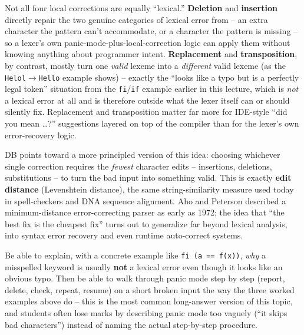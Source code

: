 \documentclass[full-course-notes.tex]{subfiles}
\begin{document}
\begin{examfocus}
Not all four local corrections are equally ``lexical.'' \textbf{Deletion} and \textbf{insertion}
directly repair the two genuine categories of lexical error from
 -- an extra character the pattern can't accommodate, or a
character the pattern is missing -- so a lexer's own panic-mode-plus-local-correction logic can
apply them without knowing anything about programmer intent. \textbf{Replacement} and
\textbf{transposition}, by contrast, mostly turn one \emph{valid} lexeme into a
\emph{different} valid lexeme (as the \texttt{Helol}$\to$\texttt{Hello} example shows) --
exactly the ``looks like a typo but is a perfectly legal token'' situation from the
\texttt{fi}/\texttt{if} example earlier in this lecture, which is \emph{not} a lexical error at
all and is therefore outside what the lexer itself can or should silently fix. Replacement and
transposition matter far more for IDE-style ``did you mean \dots?'' suggestions layered on top
of the compiler than for the lexer's own error-recovery logic.
\end{examfocus}

\begin{historynote}
DB points toward a more principled version of this idea: choosing whichever single correction
requires the \emph{fewest} character edits -- insertions, deletions, substitutions -- to turn
the bad input into something valid. This is exactly \textbf{edit distance} (Levenshtein
distance), the same string-similarity measure used today in spell-checkers and DNA sequence
alignment. Aho and Peterson described a minimum-distance error-correcting parser as early as
1972; the idea that ``the best fix is the cheapest fix'' turns out to generalize far beyond
lexical analysis, into syntax error recovery and even runtime auto-correct systems.
\end{historynote}

\begin{examfocus}
Be able to explain, with a concrete example like \texttt{fi (a == f(x))}, \emph{why} a
misspelled keyword is usually \textbf{not} a lexical error even though it looks like an obvious
typo. Then be able to walk through panic mode step by step (report, delete, check, repeat,
resume) on a short broken input the way the three worked examples above do -- this is the most
common long-answer version of this topic, and students often lose marks by describing panic
mode too vaguely (``it skips bad characters'') instead of naming the actual step-by-step
procedure.
\end{examfocus}
\end{document}
